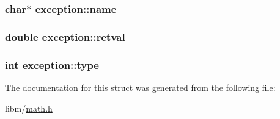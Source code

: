 \subsubsection[{name}]{\setlength{\rightskip}{0pt plus 5cm}char$\ast$ exception\+::name}\label{structexception_a1faeda487816f36cc9f39eec454bcf28}
\hypertarget{structexception_a3b9cb600557fbf2b86e7ea18861dc1bb}{}
\subsubsection[{retval}]{\setlength{\rightskip}{0pt plus 5cm}double exception\+::retval}\label{structexception_a3b9cb600557fbf2b86e7ea18861dc1bb}
\hypertarget{structexception_a87f4034c8d562b108c9f6a30c7c54733}{}
\subsubsection[{type}]{\setlength{\rightskip}{0pt plus 5cm}int exception\+::type}\label{structexception_a87f4034c8d562b108c9f6a30c7c54733}


The documentation for this struct was generated from the following file\+:\begin{DoxyCompactItemize}
\item 
libm/\hyperlink{math_8h}{math.\+h}\end{DoxyCompactItemize}
